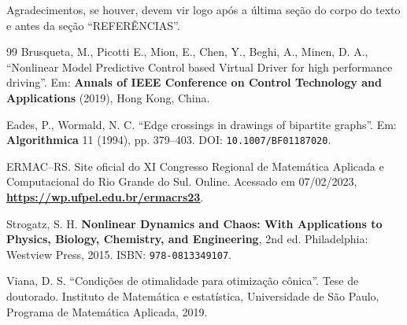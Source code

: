 \documentclass{ermacrs2023}
\begin{document}
  Agradecimentos, se houver, devem vir logo após a última seção do corpo do texto e antes da seção “REFERÊNCIAS”.

  \vfill\pagebreak
  
  \begin{thebibliography}{99}
    Brusqueta, M., Picotti E., Mion, E., Chen, Y., Beghi, A., Minen, D. A., ``Nonlinear Model Predictive Control based Virtual Driver for high performance driving''. Em: {\bf Annals of IEEE Conference on Control Technology and Applications} (2019), Hong Kong, China.
      
     Eades, P.,  Wormald, N. C.  ``Edge crossings in drawings of bipartite graphs''. Em: {\bf Algorithmica} 11 (1994), pp. 379--403. DOI: \texttt{10.1007/BF01187020}.

     ERMAC--RS. Site oficial do XI Congresso Regional de Matemática Aplicada e Computacional do Rio Grande do Sul. Online. Acessado em 07/02/2023, \href{https://wp.ufpel.edu.br/ermacrs23}{\textbf{\underline{https://wp.ufpel.edu.br/ermacrs23}}}.
      
    Strogatz, S. H. {\bf Nonlinear Dynamics and Chaos: With Applications to Physics, Biology, Chemistry, and Engineering},  2nd ed. Philadelphia: Westview Press, 2015. ISBN: \texttt{978-0813349107}.
      
     Viana, D. S.  ``Condições de otimalidade para otimização cônica''. Tese de doutorado. Instituto de Matemática e estatística, Universidade de São Paulo, Programa de Matemática Aplicada, 2019.
  \end{thebibliography}
\end{document}
